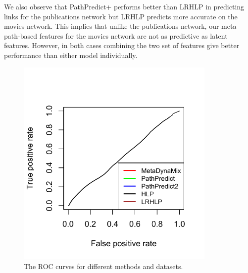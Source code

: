 We also observe that PathPredict+ performs better than LRHLP in predicting links for the publications network but LRHLP predicts more accurate on the movies network. This implies that unlike the publications network, our meta path-based features for the movies network are not as predictive as latent features. However, in both cases combining the two set of features give better performance than either model individually.




\begin{figure}[t]
\centering
\includegraphics[trim = 0mm 10mm 0mm 0mm,width=0.86\textwidth]{figs/ROC.pdf}
\caption{The ROC curves for different methods and datasets.} \label{fig:auc}
\end{figure}




